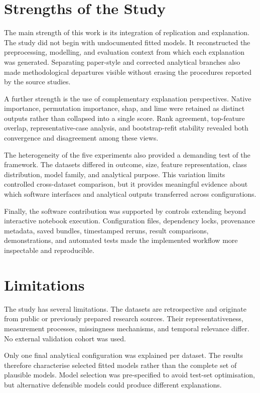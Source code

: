 \section{Strengths of the Study}

The main strength of this work is its integration of replication and explanation. The study did not begin with undocumented fitted models. It reconstructed the preprocessing, modelling, and evaluation context from which each explanation was generated. Separating paper-style and corrected analytical branches also made methodological departures visible without erasing the procedures reported by the source studies.

A further strength is the use of complementary explanation perspectives. Native importance, permutation importance, \gls{shap}, and \gls{lime} were retained as distinct outputs rather than collapsed into a single score. Rank agreement, top-feature overlap, representative-case analysis, and bootstrap-refit stability revealed both convergence and disagreement among these views.

The heterogeneity of the five experiments also provided a demanding test of the framework. The datasets differed in outcome, size, feature representation, class distribution, model family, and analytical purpose. This variation limits controlled cross-dataset comparison, but it provides meaningful evidence about which software interfaces and analytical outputs transferred across configurations.

Finally, the software contribution was supported by controls extending beyond interactive notebook execution. Configuration files, dependency locks, provenance metadata, saved bundles, timestamped reruns, result comparisons, demonstrations, and automated tests made the implemented workflow more inspectable and reproducible.

\section{Limitations}

The study has several limitations. The datasets are retrospective and originate from public or previously prepared research sources. Their representativeness, measurement processes, missingness mechanisms, and temporal relevance differ. No external validation cohort was used.

Only one final analytical configuration was explained per dataset. The results therefore characterise selected fitted models rather than the complete set of plausible models. Model selection was pre-specified to avoid test-set optimisation, but alternative defensible models could produce different explanations.

